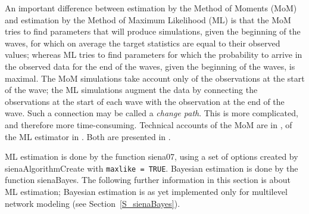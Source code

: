 \documentclass[a4paper,fleqn,11pt]{article}
\newcommand{\+}{\, + \,}
\newcommand{\sfn}[1]{\textsf{#1}}
\begin{document}
An important difference between estimation by the Method of Moments (MoM)
and estimation by the Method of Maximum Likelihood (ML) is that
the MoM tries to find parameters that will produce simulations,
given the beginning of the waves, for which
on average the target statistics are equal to their observed values;
whereas ML tries to find parameters for which the probability to arrive
in the observed data for the end of the waves, given the beginning
of the waves, is maximal. The MoM simulations take account only of the
observations at the start of the wave; the ML simulations
augment the data by connecting the
observations at the start of each wave with the observation at the end of the wave.
Such a connection may be called a \emph{change path}.
This is more complicated, and therefore more time-consuming.
Technical accounts of the MoM are in \citet{Snijders01,SnijdersEA07},
of the ML estimator in \citet{SnijdersEA10a}.
Both are presented in \citet{Snijders2017}.
\bigskip

ML estimation is done by the function \sfn{siena07}, using a set of options
created by \sfn{sienaAlgorithmCreate} with \texttt{maxlike = TRUE}.
Bayesian estimation is done by the function \sfn{sienaBayes}.
The following further information in this section is about ML estimation;
Bayesian estimation is as yet implemented only for multilevel network modeling
(see Section~\ref{S_sienaBayes}).
\end{document}
